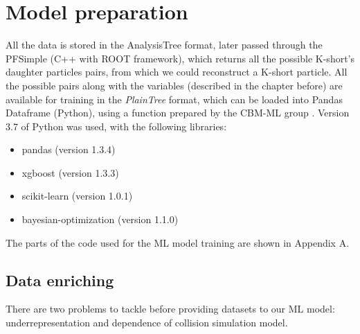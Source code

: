 \section{Model preparation}\thispagestyle{fancy}
All the data is stored in the AnalysisTree format, later passed through the PFSimple (C++ with ROOT framework),  which returns all the possible K-short's daughter particles pairs, from which we could reconstruct a K-short particle. All the possible pairs along with the variables (described in the chapter before) are available for training in the \emph{PlainTree} format, which can be loaded into Pandas Dataframe (Python), using a function prepared by the CBM-ML group \cite{plaintree}. Version 3.7 of Python was used, with the following libraries:
\begin{itemize}
    \item pandas (version 1.3.4)
    \item xgboost (version 1.3.3)
    \item scikit-learn (version 1.0.1)
    \item bayesian-optimization (version 1.1.0)
\end{itemize}
The parts of the code used for the ML model training are shown in Appendix A.

\subsection{Data enriching}
There are two problems to tackle before providing datasets to our ML model: underrepresentation and dependence of collision simulation model.

